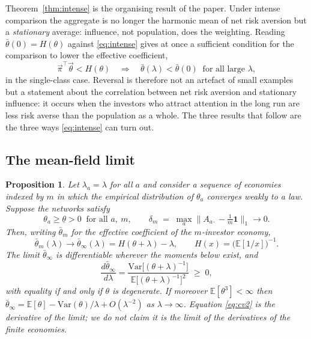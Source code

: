 \documentclass[12pt]{article}
\newtheorem{proposition}{Proposition}
\theoremstyle{definition}
\theoremstyle{remark}
\newcommand{\E}{\mathbb{E}}
\newcommand{\bth}{\bar\theta}
\begin{document}
Theorem~\ref{thm:intense} is the organising result of the paper. Under intense
comparison the aggregate is no longer the harmonic mean of net risk aversion
but a \emph{stationary} average: influence, not population, does the weighting.
Reading $\bth(0)=H(\theta)$ against \eqref{eq:intense} gives at once a
sufficient condition for the comparison to lower the effective coefficient,
%
\begin{equation}
\vec\pi^{\top}\vec\theta<H(\theta)
\quad\Longrightarrow\quad
\bth(\lambda)<\bth(0)\ \text{ for all large }\lambda ,
\label{eq:revcond}
\end{equation}
%
in the single-class case. Reversal is therefore not an artefact of small
examples but a statement about the correlation between net risk aversion and
stationary influence: it occurs when the investors who attract attention in the
long run are less risk averse than the population as a whole. The three results
that follow are the three ways \eqref{eq:intense} can turn out.

\subsection{The mean-field limit}

\begin{proposition}
\label{prop:mf}
Let $\lambda_a=\lambda$ for all $a$ and consider a sequence of economies
indexed by $m$ in which the empirical distribution of $\theta_a$ converges
weakly to a law. Suppose the networks satisfy
%
\begin{equation}
\theta_a\geq\underline\theta>0\ \text{ for all }a,\ m,
\qquad
\delta_m\;=\;\max_a\Big\|A_{a\cdot}-\tfrac1m\mathbf 1\Big\|_1\longrightarrow0 .
\label{eq:primitive}
\end{equation}
%
Then, writing $\bth_m$ for the effective
coefficient of the $m$-investor economy,
%
\begin{equation}
\bth_m(\lambda)\longrightarrow \bth_\infty(\lambda)=H(\theta+\lambda)-\lambda,
\qquad H(x)=\big(\E[1/x]\big)^{-1} .
\label{eq:mf}
\end{equation}
%
The limit $\bth_\infty$ is differentiable wherever the moments below exist,
and
%
\begin{equation}
\frac{d\bth_\infty}{d\lambda}
=\frac{\mathrm{Var}\big[(\theta+\lambda)^{-1}\big]}
{\E\big[(\theta+\lambda)^{-1}\big]^{2}}\;\geq\;0 ,
\label{eq:cv2}
\end{equation}
%
with equality if and only if $\theta$ is degenerate. If moreover
$\E[\theta^3]<\infty$ then
$\bth_\infty=\E[\theta]-\mathrm{Var}(\theta)/\lambda+O(\lambda^{-2})$ as
$\lambda\to\infty$. Equation \eqref{eq:cv2} is the derivative of the limit;
we do not claim it is the limit of the derivatives of the finite economies.
\end{proposition}
\end{document}

